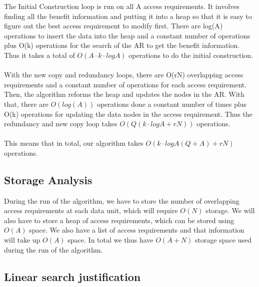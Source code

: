 \documentclass[conference]{acmsiggraph}
\begin{document}
The Initial Construction loop is run on all A access requirements. It involves finding all the benefit information and putting it into a heap so that it is easy to figure out the best access requirement to modify first. There are log(A) operations to insert the data into the heap and a constant number of operations plus O(k) operations for the search of the AR to get the benefit information. Thus it takes a total of $O(A \cdot k \cdot logA)$ operations to do the initial construction. \\
\\
With the new copy and redundancy loops, there are O(rN) overlapping access requirements and a constant number of operations for each access requirement. Then, the algorithm reforms the heap and updates the nodes in the AR. With that, there are $O(log(A))$ operations done a constant number of times plus O(k) operations for updating the data nodes in the access requirement. Thus the redundancy and new copy loop takes $O(Q(k \cdot logA + rN))$ operations. \\
\\
This means that in total, our algorithm takes $O( k \cdot logA (Q+A) + rN)$ operations. 

\subsection{Storage Analysis}

During the run of the algorithm, we have to store the number of overlapping access requirements at each data unit, which will require $O(N)$ storage. We will also have to store a heap of access requirements, which can be stored using $O(A)$ space. We also have a list of access requirements and that information will take up $O(A)$ space. In total we thus have $O(A + N)$ storage space used during the run of the algorithm. 


\subsection{Linear search justification}
\end{document}
